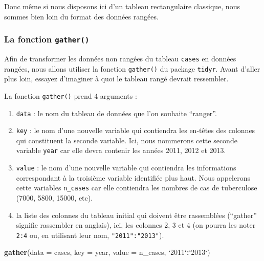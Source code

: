 \documentclass[a4paperpaper,]{article}
\newenvironment{Shaded}{\begin{snugshade}}{\end{snugshade}}
\newcommand{\KeywordTok}[1]{\textcolor[rgb]{0.13,0.29,0.53}{\textbf{#1}}}
\newcommand{\DataTypeTok}[1]{\textcolor[rgb]{0.13,0.29,0.53}{#1}}
\newcommand{\StringTok}[1]{\textcolor[rgb]{0.31,0.60,0.02}{#1}}
\newcommand{\OperatorTok}[1]{\textcolor[rgb]{0.81,0.36,0.00}{\textbf{#1}}}
\newcommand{\NormalTok}[1]{#1}
\providecommand{\tightlist}{%
  \setlength{\itemsep}{0pt}\setlength{\parskip}{0pt}}
\theoremstyle{definition}
\theoremstyle{definition}
\theoremstyle{definition}
\theoremstyle{remark}
\begin{document}
Donc même si nous disposons ici d'un tableau rectangulaire classique,
nous sommes bien loin du format des données rangées.

\subsubsection{\texorpdfstring{La fonction
\texttt{gather()}}{La fonction gather()}}\label{la-fonction-gather}

Afin de transformer les données non rangées du tableau \texttt{cases} en
données rangées, nous allons utiliser la fonction \texttt{gather()} du
package \texttt{tidyr}. Avant d'aller plus loin, essayez d'imaginer à
quoi le tableau rangé devrait ressembler.

La fonction \texttt{gather()} prend 4 arguments :

\begin{enumerate}
\def\labelenumi{\arabic{enumi}.}
\tightlist
\item
  \texttt{data} : le nom du tableau de données que l'on souhaite
  ``ranger''.
\item
  \texttt{key} : le nom d'une nouvelle variable qui contiendra les
  en-têtes des colonnes qui constituent la seconde variable. Ici, nous
  nommerons cette seconde variable \texttt{year} car elle devra contenir
  les années 2011, 2012 et 2013.
\item
  \texttt{value} : le nom d'une nouvelle variable qui contiendra les
  informations correspondant à la troisième variable identifiée plus
  haut. Nous appelerons cette variables \texttt{n\_cases} car elle
  contiendra les nombres de cas de tuberculose (7000, 5800, 15000, etc).
\item
  la liste des colonnes du tableau initial qui doivent être rassemblées
  (``gather'' signifie rassembler en anglais), ici, les colonnes 2, 3 et
  4 (on pourra les noter \texttt{2:4} ou, en utilisant leur nom,
  \texttt{"2011":"2013"}).
\end{enumerate}

\begin{Shaded}
\begin{Highlighting}[]
\KeywordTok{gather}\NormalTok{(}\DataTypeTok{data =}\NormalTok{ cases, }\DataTypeTok{key =}\NormalTok{ year, }\DataTypeTok{value =}\NormalTok{ n_cases, }\StringTok{`}\DataTypeTok{2011}\StringTok{`}\OperatorTok{:}\StringTok{`}\DataTypeTok{2013}\StringTok{`}\NormalTok{)}
\end{Highlighting}
\end{Shaded}
\end{document}
